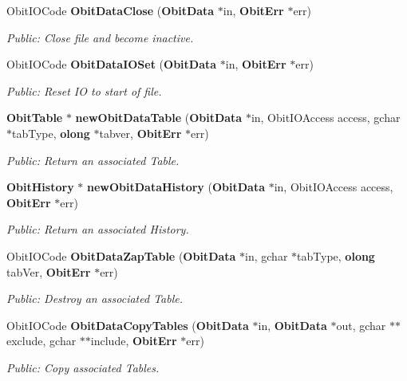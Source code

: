\begin{CompactItemize}
Obit\-IOCode {\bf Obit\-Data\-Close} ({\bf Obit\-Data} $\ast$in, {\bf Obit\-Err} $\ast$err)
\begin{CompactList}\small\item\em Public: Close file and become inactive. \item\end{CompactList}\item 
Obit\-IOCode {\bf Obit\-Data\-IOSet} ({\bf Obit\-Data} $\ast$in, {\bf Obit\-Err} $\ast$err)
\begin{CompactList}\small\item\em Public: Reset IO to start of file. \item\end{CompactList}\item 
{\bf Obit\-Table} $\ast$ {\bf new\-Obit\-Data\-Table} ({\bf Obit\-Data} $\ast$in, Obit\-IOAccess access, gchar $\ast$tab\-Type, {\bf olong} $\ast$tabver, {\bf Obit\-Err} $\ast$err)
\begin{CompactList}\small\item\em Public: Return an associated Table. \item\end{CompactList}\item 
{\bf Obit\-History} $\ast$ {\bf new\-Obit\-Data\-History} ({\bf Obit\-Data} $\ast$in, Obit\-IOAccess access, {\bf Obit\-Err} $\ast$err)
\begin{CompactList}\small\item\em Public: Return an associated History. \item\end{CompactList}\item 
Obit\-IOCode {\bf Obit\-Data\-Zap\-Table} ({\bf Obit\-Data} $\ast$in, gchar $\ast$tab\-Type, {\bf olong} tab\-Ver, {\bf Obit\-Err} $\ast$err)
\begin{CompactList}\small\item\em Public: Destroy an associated Table. \item\end{CompactList}\item 
Obit\-IOCode {\bf Obit\-Data\-Copy\-Tables} ({\bf Obit\-Data} $\ast$in, {\bf Obit\-Data} $\ast$out, gchar $\ast$$\ast$exclude, gchar $\ast$$\ast$include, {\bf Obit\-Err} $\ast$err)
\begin{CompactList}\small\item\em Public: Copy associated Tables. \item\end{CompactList}\item 

\end{CompactItemize}
